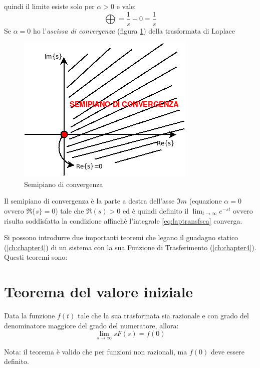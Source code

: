 \documentclass[a4paper]{report}
\begin{document}
quindi il limite esiste solo per $\alpha >0$ e vale:
\begin{displaymath}
  \bigoplus = \frac{1}{s}-0 = \frac{1}{s}
\end{displaymath}
Se $\alpha = 0$ ho l'\emph{ascissa di convergenza} (figura
\ref{fig:fig5}) della trasformata di Laplace
\begin{figure}[!hbp]
  \begin{center}
    \includegraphics[scale=0.5]{./figures/semipconv.png}
    \caption{Semipiano di convergenza}\label{fig:fig5}
  \end{center}
\end{figure} 
Il semipiano di convergenza \`e la parte a destra dell'asse $\Im m$
(equazione $\alpha=0$ ovvero $\Re\{s\}=0$) tale che $\Re(s)>0$ ed \`e
quindi definito il $\lim_{t \to \infty}e^{-st}$ ovvero risulta
soddisfatta la condizione affinch\`e l'integrale \ref{eq:laptransfsca}
converga.

Si possono introdurre  due importanti teoremi che legano il
guadagno statico (\ref{ch:chapter4}) di un sistema con la sua Funzione
di Trasferimento (\ref{ch:chapter4}). Questi teoremi sono:

\section{Teorema del valore iniziale}
Data la funzione $f(t)$ tale che la sua trasformata sia razionale e
con grado del denominatore maggiore del grado del numeratore, allora:
\begin{equation}
  \lim_{s \to \infty} sF(s)=f(0)
\end{equation}

Nota: il teorema \`e valido che per funzioni non razionali, ma $f(0)$
deve essere definito.
\end{document}
